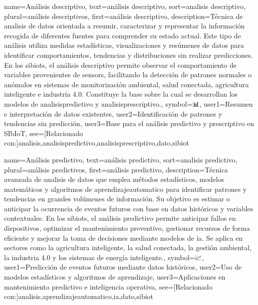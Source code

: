 {
	name={An{\'a}lisis descriptivo},
	text={an{\'a}lisis descriptivo},
	sort={analisis descriptivo},
	plural={an{\'a}lisis descriptivos},
	first={an{\'a}lisis descriptivo},
	description={T{\'e}cnica de \gls{analisis} de datos orientada a resumir, caracterizar y representar la informaci{\'o}n recogida de diferentes fuentes para comprender su estado actual. 
		Este tipo de an{\'a}lisis utiliza medidas estad{\'i}sticas, visualizaciones y res{\'u}menes de datos para identificar comportamientos, tendencias y distribuciones sin realizar predicciones. 
		En los \glspl{sibiot}, el an{\'a}lisis descriptivo permite observar el comportamiento de variables provenientes de \glspl{sensor}, facilitando la detecci{\'o}n de patrones normales o an{\'o}malos en sistemas de monitorizaci{\'o}n ambiental, salud conectada, agricultura inteligente e industria 4.0. 
		Constituye la base sobre la cual se desarrollan los modelos de \gls{analisispredictivo} y \gls{analisisprescriptivo}.},
	symbol={📊},
	user1={Resumen e interpretaci{\'o}n de datos existentes},
	user2={Identificaci{\'o}n de patrones y tendencias sin predicci{\'o}n},
	user3={Base para el an{\'a}lisis predictivo y prescriptivo en SIbIoT},
	see={[Relacionado con:]{analisis,analisispredictivo,analisisprescriptivo,dato,sibiot}}
}

{
	name={An{\'a}lisis predictivo},
	text={an{\'a}lisis predictivo},
	sort={analisis predictivo},
	plural={an{\'a}lisis predictivos},
	first={an{\'a}lisis predictivo},
	description={T{\'e}cnica avanzada de \gls{analisis} de datos que emplea m{\'e}todos estad{\'i}sticos, modelos matem{\'a}ticos y \glspl{algoritmo} de \gls{aprendizajeautomatico} para identificar patrones y tendencias en grandes vol{\'u}menes de informaci{\'o}n. 
		Su objetivo es estimar o anticipar la ocurrencia de eventos futuros con base en datos hist{\'o}ricos y variables contextuales. 
		En los \glspl{sibiot}, el an{\'a}lisis predictivo permite anticipar fallos en \glspl{dispositivo}, optimizar el mantenimiento preventivo, gestionar recursos de forma eficiente y mejorar la toma de decisiones mediante modelos de \gls{ia}. 
		Se aplica en sectores como la agricultura inteligente, la salud conectada, la gesti{\'o}n ambiental, la industria 4.0 y los sistemas de energ{\'i}a inteligente.},
	symbol={📈},
	user1={Predicci{\'o}n de eventos futuros mediante datos hist{\'o}ricos},
	user2={Uso de modelos estad{\'i}sticos y \glspl{algoritmo} de aprendizaje},
	user3={Aplicaciones en mantenimiento predictivo e inteligencia operativa},
	see={[Relacionado con:]{analisis,aprendizajeautomatico,ia,dato,sibiot}}
}

